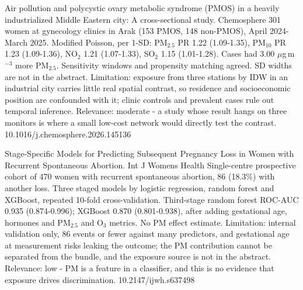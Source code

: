\documentclass[10pt]{article}
\begin{document}
{Air pollution and polycystic ovary metabolic syndrome (PMOS) in a heavily industrialized Middle Eastern city: A cross-sectional study.}
{Chemosphere}
{301 women at gynecology clinics in Arak (153 PMOS, 148 non-PMOS), April 2024-March 2025. Modified Poisson, per 1-SD: PM$_{2.5}$ PR 1.22 (1.09-1.35), PM$_{10}$ PR 1.23 (1.09-1.36), NO$_2$ 1.21 (1.07-1.33), SO$_2$ 1.15 (1.01-1.28). Cases had 3.00 $\mu$g\,m$^{-3}$ more PM$_{2.5}$. Sensitivity windows and propensity matching agreed. SD widths are not in the abstract. Limitation: exposure from three stations by IDW in an industrial city carries little real spatial contrast, so residence and socioeconomic position are confounded with it; clinic controls and prevalent cases rule out temporal inference. Relevance: moderate - a study whose result hangs on three monitors is where a small low-cost network would directly test the contrast.}
{10.1016/j.chemosphere.2026.145136}

{Stage-Specific Models for Predicting Subsequent Pregnancy Loss in Women with Recurrent Spontaneous Abortion.}
{Int J Womens Health}
{Single-centre prospective cohort of 470 women with recurrent spontaneous abortion, 86 (18.3\%) with another loss. Three staged models by logistic regression, random forest and XGBoost, repeated 10-fold cross-validation. Third-stage random forest ROC-AUC 0.935 (0.874-0.996); XGBoost 0.870 (0.801-0.938), after adding gestational age, hormones and PM$_{2.5}$ and O$_3$ metrics. No PM effect estimate. Limitation: internal validation only, 86 events or fewer against many predictors, and gestational age at measurement risks leaking the outcome; the PM contribution cannot be separated from the bundle, and the exposure source is not in the abstract. Relevance: low - PM is a feature in a classifier, and this is no evidence that exposure drives discrimination.}
{10.2147/ijwh.s637498}

\par{}\baselineskip{}\baselineskip
{}
\end{document}
